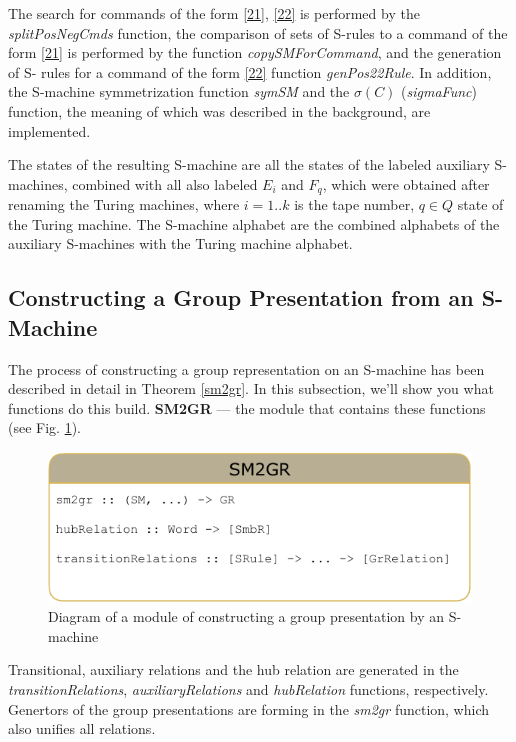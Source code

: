 \documentclass[conference]{IEEEtran}
\theoremstyle{definition}
\begin{document}
The search for commands of the form \eqref{21}, \eqref{22} is performed by the \textit{splitPosNegCmds} function, the comparison of sets of S-rules to a command of the form \eqref{21} is performed by the function \textit{copySMForCommand}, and the generation of S- rules for a command of the form \eqref{22} function \textit{genPos22Rule}.
In addition, the S-machine symmetrization function \textit{symSM} and the $ \sigma(C) $ (\textit{sigmaFunc}) function, the meaning of which was described in the background, are implemented.

The states of the resulting S-machine are all the states of the labeled auxiliary S-machines, combined with all also labeled $ E_i $ and $ F_q $, which were obtained after renaming the Turing machines, where $ i = 1..k $ is the tape number, $ q \in Q $ state of the Turing machine.
The S-machine alphabet are the combined alphabets of the auxiliary S-machines with the Turing machine alphabet.

\subsection{Constructing a Group Presentation from an S-Machine}

The process of constructing a group representation on an S-machine has been described in detail in Theorem \ref{sm2gr}. In this subsection, we'll show you what functions do this build.
\textbf{SM2GR} --- the module that contains these functions (see Fig. \ref{fig:SM2GR}).

\begin{figure}[H]
\centering
  \includegraphics[width=\linewidth]{pics/SM2GR(1).pdf}
  \caption{Diagram of a module of constructing a group presentation by an S-machine}
  \label{fig:SM2GR}
\end{figure}

Transitional, auxiliary relations and the hub relation are generated in the \textit{transitionRelations}, \textit{auxiliaryRelations} and \textit{hubRelation} functions, respectively. Genertors of the group presentations are forming in the \textit{sm2gr} function, which also unifies all relations.
\end{document}
